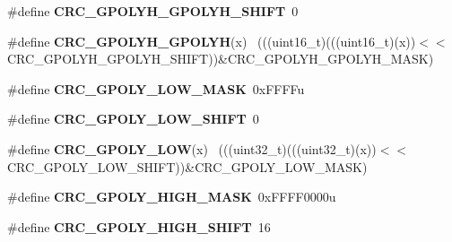 \begin{DoxyCompactItemize}
\item 
\hypertarget{group___c_r_c___register___masks_ga62fa126178d7137b39b75ad2d63edae9}{}\#define {\bfseries C\+R\+C\+\_\+\+G\+P\+O\+L\+Y\+H\+\_\+\+G\+P\+O\+L\+Y\+H\+\_\+\+S\+H\+I\+F\+T}~0\label{group___c_r_c___register___masks_ga62fa126178d7137b39b75ad2d63edae9}

\item 
\hypertarget{group___c_r_c___register___masks_ga7bc7d87ea6686671ac9777ae843e18d3}{}\#define {\bfseries C\+R\+C\+\_\+\+G\+P\+O\+L\+Y\+H\+\_\+\+G\+P\+O\+L\+Y\+H}(x)                                      ~(((uint16\+\_\+t)(((uint16\+\_\+t)(x))$<$$<$C\+R\+C\+\_\+\+G\+P\+O\+L\+Y\+H\+\_\+\+G\+P\+O\+L\+Y\+H\+\_\+\+S\+H\+I\+F\+T))\&C\+R\+C\+\_\+\+G\+P\+O\+L\+Y\+H\+\_\+\+G\+P\+O\+L\+Y\+H\+\_\+\+M\+A\+S\+K)\label{group___c_r_c___register___masks_ga7bc7d87ea6686671ac9777ae843e18d3}

\item 
\hypertarget{group___c_r_c___register___masks_ga861d4f6f458051a63a7b01e6e5d8794b}{}\#define {\bfseries C\+R\+C\+\_\+\+G\+P\+O\+L\+Y\+\_\+\+L\+O\+W\+\_\+\+M\+A\+S\+K}~0x\+F\+F\+F\+Fu\label{group___c_r_c___register___masks_ga861d4f6f458051a63a7b01e6e5d8794b}

\item 
\hypertarget{group___c_r_c___register___masks_ga3830f95399bd5190027aaf00f307d10b}{}\#define {\bfseries C\+R\+C\+\_\+\+G\+P\+O\+L\+Y\+\_\+\+L\+O\+W\+\_\+\+S\+H\+I\+F\+T}~0\label{group___c_r_c___register___masks_ga3830f95399bd5190027aaf00f307d10b}

\item 
\hypertarget{group___c_r_c___register___masks_ga8ca8f0515fe1c754a85c9675a72724a2}{}\#define {\bfseries C\+R\+C\+\_\+\+G\+P\+O\+L\+Y\+\_\+\+L\+O\+W}(x)                                              ~(((uint32\+\_\+t)(((uint32\+\_\+t)(x))$<$$<$C\+R\+C\+\_\+\+G\+P\+O\+L\+Y\+\_\+\+L\+O\+W\+\_\+\+S\+H\+I\+F\+T))\&C\+R\+C\+\_\+\+G\+P\+O\+L\+Y\+\_\+\+L\+O\+W\+\_\+\+M\+A\+S\+K)\label{group___c_r_c___register___masks_ga8ca8f0515fe1c754a85c9675a72724a2}

\item 
\hypertarget{group___c_r_c___register___masks_ga96c07e55f3d3c43d7b3e7637bc854ed6}{}\#define {\bfseries C\+R\+C\+\_\+\+G\+P\+O\+L\+Y\+\_\+\+H\+I\+G\+H\+\_\+\+M\+A\+S\+K}~0x\+F\+F\+F\+F0000u\label{group___c_r_c___register___masks_ga96c07e55f3d3c43d7b3e7637bc854ed6}

\item 
\hypertarget{group___c_r_c___register___masks_ga991debc471e54dcf5297d6a42c5778e6}{}\#define {\bfseries C\+R\+C\+\_\+\+G\+P\+O\+L\+Y\+\_\+\+H\+I\+G\+H\+\_\+\+S\+H\+I\+F\+T}~16\label{group___c_r_c___register___masks_ga991debc471e54dcf5297d6a42c5778e6}


\end{DoxyCompactItemize}

